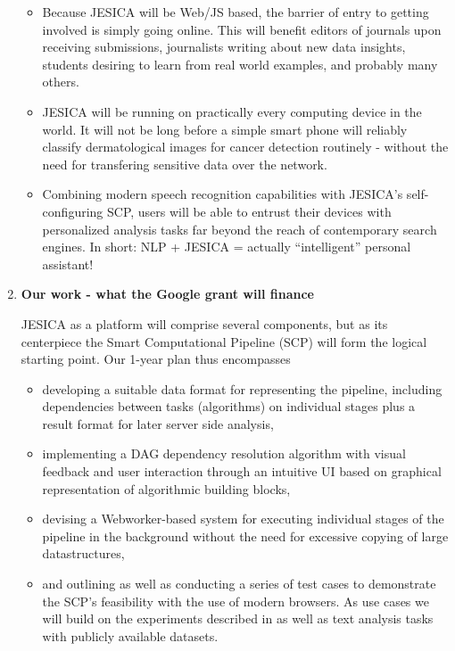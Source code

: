 \documentclass[a4paper,10pt]{article}
\begin{document}
\begin{enumerate}
\begin{itemize}
 \item Because JESICA will be Web/JS based, the barrier of entry to getting involved is simply going online. This will benefit editors of journals upon receiving submissions, journalists writing about new data insights, students desiring to learn from real world examples, and probably many others.

 \item JESICA will be running on practically every computing device in the world. It will not be long before a simple smart phone will reliably classify dermatological images for cancer detection routinely - without the need for transfering sensitive data over the network.

 \item Combining modern speech recognition capabilities with JESICA's self-configuring SCP, users will be able to entrust their devices with personalized analysis tasks far beyond the reach of contemporary search engines. In short: NLP + JESICA = actually ``intelligent'' personal assistant!
\end{itemize}



\item \textbf{Our work - what the Google grant will finance}

JESICA as a platform will comprise several components, but as its centerpiece the Smart Computational Pipeline (SCP) will form the logical starting point. Our 1-year plan thus encompasses
\begin{itemize}
 \item developing a suitable data format for representing the pipeline, including dependencies between tasks (algorithms) on individual stages plus a result format for later server side analysis,
 \item implementing a DAG dependency resolution algorithm with visual feedback and user interaction through an intuitive UI based on graphical representation of algorithmic building blocks,
 \item devising a Webworker-based system for executing individual stages of the pipeline in the background without the need for excessive copying of large datastructures,
 \item and outlining as well as conducting a series of test cases to demonstrate the SCP's feasibility with the use of modern browsers. As use cases we will build on the experiments described in \citep{GraphExtractPaper} as well as text analysis tasks with publicly available datasets.
\end{itemize}


\end{enumerate}
\end{document}
